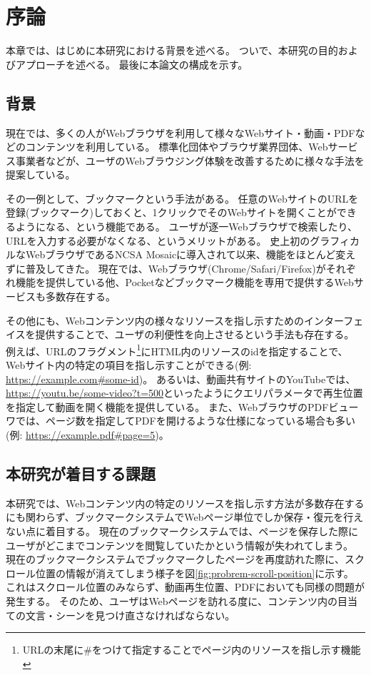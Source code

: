 \chapter{序論}
\label{chap:introduction}

本章では、はじめに本研究における背景を述べる。
ついで、本研究の目的およびアプローチを述べる。
最後に本論文の構成を示す。

\section{背景}
\label{section:background}

現在では、多くの人がWebブラウザを利用して様々なWebサイト・動画・PDFなどのコンテンツを利用している。
標準化団体やブラウザ業界団体、Webサービス事業者などが、ユーザのWebブラウジング体験を改善するために様々な手法を提案している。

その一例として、ブックマークという手法がある。
任意のWebサイトのURLを登録(ブックマーク)しておくと、1クリックでそのWebサイトを開くことができるようになる、という機能である。
ユーザが逐一Webブラウザで検索したり、URLを入力する必要がなくなる、というメリットがある。
史上初のグラフィカルなWebブラウザであるNCSA Mosaic\cite{ncsa-mosaic}に導入されて以来、機能をほとんど変えずに普及してきた。
現在では、Webブラウザ(Chrome\cite{chrome}/Safari\cite{safari}/Firefox\cite{firefox})がそれぞれ機能を提供している他、Pocket\cite{pocket}などブックマーク機能を専用で提供するWebサービスも多数存在する。

その他にも、Webコンテンツ内の様々なリソースを指し示すためのインターフェイスを提供することで、ユーザの利便性を向上させるという手法も存在する。
例えば、URLのフラグメント\footnote{URLの末尾に\#をつけて指定することでページ内のリソースを指し示す機能}にHTML内のリソースのidを指定することで、Webサイト内の特定の項目を指し示すことができる(例: \url{https://example.com#some-id})。
あるいは、動画共有サイトのYouTube\cite{youtube}では、\url{https://youtu.be/some-video?t=500}といったようにクエリパラメータで再生位置を指定して動画を開く機能を提供している。
また、WebブラウザのPDFビューワでは、ページ数を指定してPDFを開けるような仕様になっている場合も多い(例: \url{https://example.pdf#page=5})。

\section{本研究が着目する課題}
本研究では、Webコンテンツ内の特定のリソースを指し示す方法が多数存在するにも関わらず、ブックマークシステムでWebページ単位でしか保存・復元を行えない点に着目する。
現在のブックマークシステムでは、ページを保存した際にユーザがどこまでコンテンツを閲覧していたかという情報が失われてしまう。
現在のブックマークシステムでブックマークしたページを再度訪れた際に、スクロール位置の情報が消えてしまう様子を図\ref{fig:probrem-scroll-position}に示す。
これはスクロール位置のみならず、動画再生位置、PDFにおいても同様の問題が発生する。
そのため、ユーザはWebページを訪れる度に、コンテンツ内の目当ての文言・シーンを見つけ直さなければならない。

